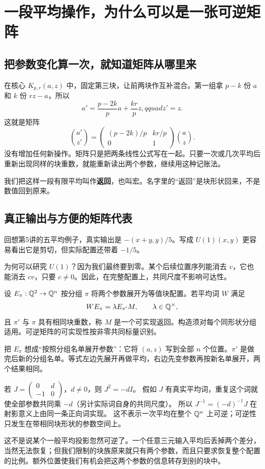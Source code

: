 \chapter{一段平均操作，为什么可以是一张可逆矩阵}\label{sec:arithmetic}
\section{把参数变化算一次，就知道矩阵从哪里来}
在核心 $K_{p,r}(a,z)$ 中，固定第三块，让前两块作互补混合。第一组拿 $p-k$ 份 $a$ 和 $k$ 份 $rz-a$，所以
\[a'=\frac{p-2k}{p}a+\frac{kr}{p}z,qquad z'=z.
\]
这就是矩阵
\[\binom{a'}{z'}=
\begin{pmatrix}(p-2k)/p&kr/p\\0&1\end{pmatrix}\binom az.
\]
没有增加任何新操作。矩阵只是把两条线性公式写在一起。只要一次或几次平均后重新出现同样的块重数，就能重新读出两个参数，继续用这种记账法。

我们把这样一段有限平均叫作\textbf{返回}，也叫宏。名字里的“返回”是块形状回来，不是数值回到原来。

\section{真正输出与方便的矩阵代表}
回想第5讲的五平均例子，真实输出是 $-(x+y,y)/5$。写成 $U(1)(x,y)$ 更容易看出它是剪切，但实际配置还带着 $-1/5$。

为何可以研究 $U(1)$？因为我们最终要到零。某个后续位置序列能消去 $v$，它也能消去 $cv$，只要 $c\ne0$。因此，在完整配置上，共同尺度不影响可达性。
\begin{definition}\label{def:return}
设 $E_\pi:\mathbb Q^2\to\mathbb Q^n$ 按分组 $\pi$ 将两个参数展开为等值块配置。若平均词 $W$ 满足
\begin{equation}\label{eq:return}
WE_\pi=\lambda E_{\pi'}M,\qquad \lambda\in\mathbb Q^\times,
\end{equation}
且 $\pi'$ 与 $\pi$ 具有相同块重数，称 $M$ 是一个可实现返回。构造须对每个同形状分组适用。可逆矩阵的可实现性按非零共同标量识别。
\end{definition}
把 $E_\pi$ 想成“按照分组名单展开参数”：它将 $(a,z)$ 写到全部 $n$ 个位置。$\pi'$ 是做完后新的分组名单。等式左边先展开再做平均，右边先变参数再按新名单展开，两个结果相同。

\begin{example}[两次正向返回提供逆]
若 $J=\left(\begin{smallmatrix}0&d\\-1&0\end{smallmatrix}\right)$，$d\ne0$，则 $J^2=-dI$。
假如 $J$ 有真实平均词，重复这个词就使全部参数共同乘 $-d$（另计实际词自身的共同尺度）。
所以 $J^{-1}=(-d)^{-1}J$ 在射影意义上由同一条正向词实现。
这不表示一次平均在整个 $\mathbb Q^n$ 上可逆；可逆性只发生在带相同块形状的参数空间上。
\end{example}
这不是说某个一般平均投影忽然可逆了。一个任意三元输入平均后丢掉两个差分，当然无法恢复；但我们限制的块族原来就只有两个参数，而且只要求恢复整个配置的比例。额外位置使我们有机会把这两个参数的信息转存到别的块中。

